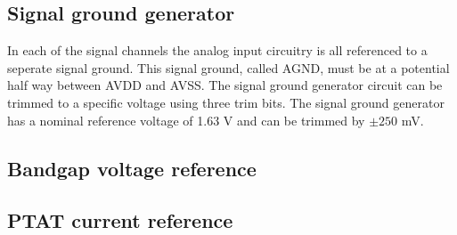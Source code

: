 \documentclass[12pt,oneside,final]{siuethesis}
\theoremstyle{definition}
\begin{document}
\subsection{Signal ground generator}
\par In each of the signal channels the analog input circuitry is all referenced to a seperate signal ground. This signal ground, called AGND, must be at a potential half way between AVDD and AVSS. The signal ground generator circuit can be trimmed to a specific voltage using three trim bits. The signal ground generator has a nominal reference voltage of 1.63 V and can be trimmed by $\pm 250$ mV.

\subsection{Bandgap voltage reference}

\subsection{PTAT current reference}
\end{document}
